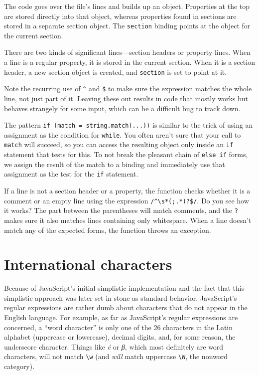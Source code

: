 The code goes over the file's lines and builds up an object. Properties at the top are stored directly into that object, whereas properties found in sections are stored in a separate section object. The \lstinline`section` binding points at the object for the current section.

There are two kinds of significant lines—section headers or property lines. When a line is a regular property, it is stored in the current section. When it is a section header, a new section object is created, and \lstinline`section` is set to point at it.

Note the recurring use of \lstinline`^` and \lstinline`$` to make sure the expression matches the whole line, not just part of it. Leaving these out results in code that mostly works but behaves strangely for some input, which can be a difficult bug to track down.

The pattern \lstinline`if (match = string.match(...))` is similar to the trick of using an assignment as the condition for \lstinline`while`. You often aren't sure that your call to \lstinline`match` will succeed, so you can access the resulting object only inside an \lstinline`if` statement that tests for this. To not break the pleasant chain of \lstinline`else if` forms, we assign the result of the match to a binding and immediately use that assignment as the test for the \lstinline`if` statement.

If a line is not a section header or a property, the function checks whether it is a comment or an empty line using the expression \lstinline`/^\s*(;.*)?$/`. Do you see how it works? The part between the parentheses will match comments, and the \lstinline`?` makes sure it also matches lines containing only whitespace. When a line doesn't match any of the expected forms, the function throws an exception.

\section{International characters}

Because of JavaScript's initial simplistic implementation and the fact that this simplistic approach was later set in stone as standard behavior, JavaScript's regular expressions are rather dumb about characters that do not appear in the English language. For example, as far as JavaScript's regular expressions are concerned, a ``word
character'' is only one of the 26 characters in the Latin alphabet (uppercase or lowercase), decimal digits, and, for some reason, the underscore character. Things like \emph{é} or \emph{β}, which most definitely are word characters, will not match \lstinline`\w` (and \emph{will} match uppercase \lstinline`\W`, the nonword category).

